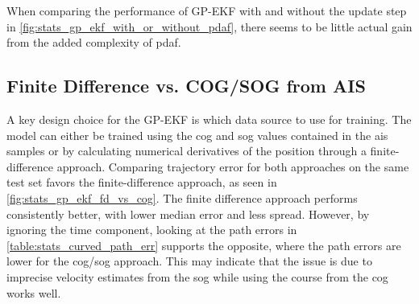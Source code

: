 When comparing the performance of GP-EKF with and without the update step in \cref{fig:stats_gp_ekf_with_or_without_pdaf}, there seems to be little actual gain from the added complexity of \acrshort{pdaf}.


\subsection{Finite Difference vs. COG/SOG from AIS}
\begin{figure}[h]
    \centering

\end{figure}
A key design choice for the GP-EKF is which data source to use for training. The model can either be trained using the \acrshort{cog} and \acrshort{sog} values contained in the \acrshort{ais} samples or by calculating numerical derivatives of the position through a finite-difference approach. Comparing trajectory error for both approaches on the same test set favors the finite-difference approach, as seen in \cref{fig:stats_gp_ekf_fd_vs_cog}. The finite difference approach performs consistently better, with lower median error and less spread. However, by ignoring the time component, looking at the path errors in \cref{table:stats_curved_path_err} supports the opposite, where the path errors are lower for the \acrshort{cog}/\acrshort{sog} approach. This may indicate that the issue is due to imprecise velocity estimates from the \acrshort{sog} while using the course from the \acrshort{cog} works well.


